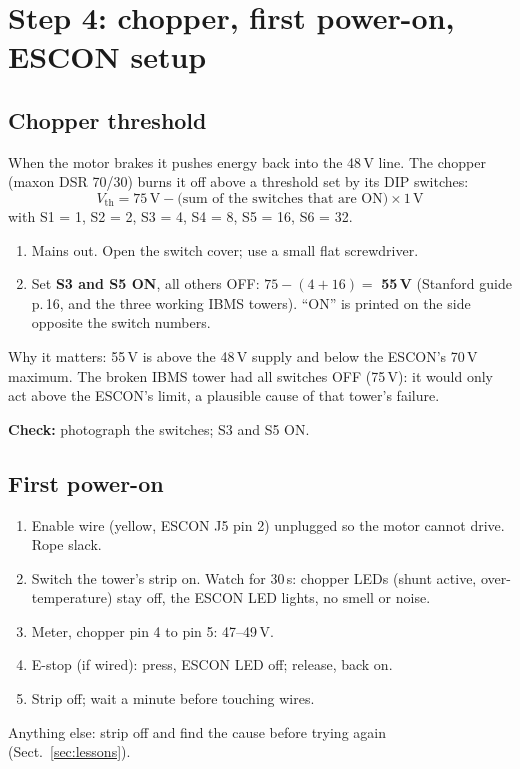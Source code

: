 \section{Step 4: chopper, first power-on, ESCON setup}\label{sec:walk-chopper}

\subsection{Chopper threshold}
When the motor brakes it pushes energy back into the 48\,V line. The chopper (maxon DSR 70/30) burns it
off above a threshold set by its DIP switches:
\[ V_\mathrm{th} = 75\,\mathrm{V} - \text{(sum of the switches that are ON)} \times 1\,\mathrm{V} \]
with S1 = 1, S2 = 2, S3 = 4, S4 = 8, S5 = 16, S6 = 32.
\begin{enumerate}
\item Mains out. Open the switch cover; use a small flat screwdriver.
\item Set \textbf{S3 and S5 ON}, all others OFF: $75 - (4 + 16) = $ \textbf{55\,V} (Stanford guide p.\,16,
and the three working IBMS towers). ``ON'' is printed on the side opposite the switch numbers.
\end{enumerate}
Why it matters: 55\,V is above the 48\,V supply and below the ESCON's 70\,V maximum. The broken IBMS tower
had all switches OFF (75\,V): it would only act above the ESCON's limit, a plausible cause of that tower's failure.

\textbf{Check:} photograph the switches; S3 and S5 ON.

\subsection{First power-on}
\begin{enumerate}
\item Enable wire (yellow, ESCON J5 pin 2) unplugged so the motor cannot drive. Rope slack.
\item Switch the tower's strip on. Watch for 30\,s: chopper LEDs (shunt active, over-temperature) stay off,
the ESCON LED lights, no smell or noise.
\item Meter, chopper pin 4 to pin 5: 47--49\,V.
\item E-stop (if wired): press, ESCON LED off; release, back on.
\item Strip off; wait a minute before touching wires.
\end{enumerate}
Anything else: strip off and find the cause before trying again (Sect.~\ref{sec:lessons}).

